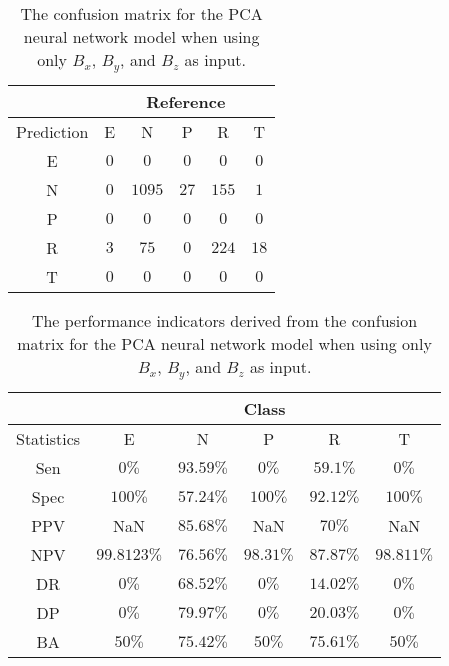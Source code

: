\begin{table}[!ht]
	\centering
	\begin{tabular}{|c|c|c|c|c|c|}
		\hline
		 & \multicolumn{5}{|c|}{Reference} \\ \hline
		 Prediction & E & N & P & R & T \\ \hline
		 E & $0$ & $0$ & $0$ & $0$ & $0$ \\ \hline
		 N & $0$ & $1095$ & $27$ & $155$ & $1$ \\ \hline
		 P & $0$ & $0$ & $0$ & $0$ & $0$ \\ \hline
		 R & $3$ & $75$ & $0$ & $224$ & $18$ \\ \hline
		 T & $0$ & $0$ & $0$ & $0$ & $0$ \\ \hline
	\end{tabular}
	\caption{The confusion matrix for the PCA neural network model when using only $B_{x}$, $B_{y}$, and $B_{z}$ as input.}
	\label{tab:cm:coord:pcaNNet}
\end{table}

\begin{table}[!ht]
	\centering
	\begin{tabular}{|c|c|c|c|c|c|}
		\hline
		 & \multicolumn{5}{c|}{Class} \\ \hline
		Statistics & E & N & P & R & T \\ \hline
		Sen & $0\%$ & $93.59\%$ & $0\%$ & $59.1\%$ & $0\%$ \\ \hline
		Spec & $100\%$ & $57.24\%$ & $100\%$ & $92.12\%$ & $100\%$ \\ \hline
		PPV & NaN & $85.68\%$ & NaN & $70\%$ & NaN \\ \hline
		NPV & $99.8123\%$ & $76.56\%$ & $98.31\%$ & $87.87\%$ & $98.811\%$ \\ \hline
		DR & $0\%$ & $68.52\%$ & $0\%$ & $14.02\%$ & $0\%$ \\ \hline
		DP & $0\%$ & $79.97\%$ & $0\%$ & $20.03\%$ & $0\%$ \\ \hline
		BA & $50\%$ & $75.42\%$ & $50\%$ & $75.61\%$ & $50\%$ \\ \hline
	\end{tabular}
	\caption{The performance indicators derived from the confusion matrix for the PCA neural network model when using only $B_{x}$, $B_{y}$, and $B_{z}$ as input.}
	\label{tab:cs:reverse:coord:pcaNNet}
\end{table}
